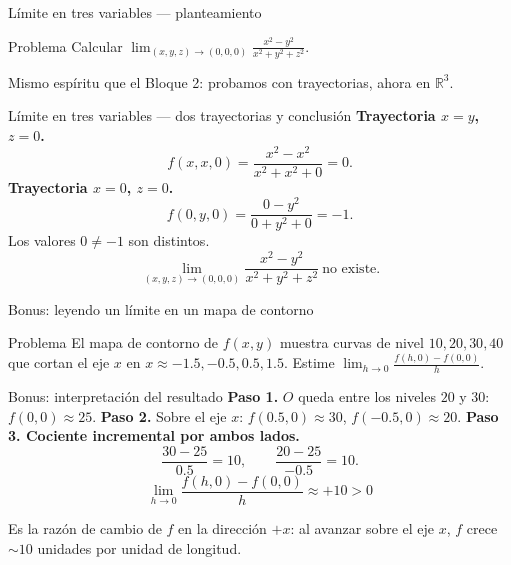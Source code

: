\documentclass[11pt,aspectratio=169]{beamer}
\begin{document}
\begin{frame}{Límite en tres variables --- planteamiento}
  \begin{block}{Problema}
    Calcular $\displaystyle\lim_{(x,y,z)\to(0,0,0)}\frac{x^2-y^2}{x^2+y^2+z^2}$.
  \end{block}
  \pause
  \vspace{4pt}
  \begin{center}\small\color{gray60} Mismo espíritu que el Bloque 2: probamos con trayectorias, ahora en $\mathbb R^3$.\end{center}
\end{frame}

\begin{frame}{Límite en tres variables --- dos trayectorias y conclusión}
  \textbf{Trayectoria $x=y$, $z=0$.}
  \[
    f(x,x,0)=\frac{x^2-x^2}{x^2+x^2+0}=0.
  \]
  \pause
  \textbf{Trayectoria $x=0$, $z=0$.}
  \[
    f(0,y,0)=\frac{0-y^2}{0+y^2+0}=-1.
  \]
  \pause
  Los valores $0\neq -1$ son distintos.
  \pause
  \[
    \boxed{\lim_{(x,y,z)\to(0,0,0)}\frac{x^2-y^2}{x^2+y^2+z^2}\ \text{no existe.}}
  \]
\end{frame}

\begin{frame}{Bonus: leyendo un límite en un mapa de contorno}
  \begin{block}{Problema}
    El mapa de contorno de $f(x,y)$ muestra curvas de nivel $10,20,30,40$ que cortan el eje $x$ en $x\approx-1.5,-0.5,0.5,1.5$. Estime
    $\displaystyle\lim_{h\to 0}\frac{f(h,0)-f(0,0)}{h}$.
  \end{block}
  \vspace{-2pt}
  \begin{center}
  \end{center}
\end{frame}

\begin{frame}{Bonus: interpretación del resultado}
  \textbf{Paso 1.} $O$ queda entre los niveles $20$ y $30$: $f(0,0)\approx 25$.
  \pause
  \textbf{Paso 2.} Sobre el eje $x$: $f(0.5,0)\approx 30$, $f(-0.5,0)\approx 20$.
  \pause
  \textbf{Paso 3. Cociente incremental por ambos lados.}
  \[
    \frac{30-25}{0.5}=10,
    \qquad
    \frac{20-25}{-0.5}=10.
  \]
  \pause
  \[
    \boxed{\lim_{h\to 0}\frac{f(h,0)-f(0,0)}{h}\approx +10>0}
  \]
  \pause
  \begin{center}\small\color{gray60} Es la razón de cambio de $f$ en la dirección $+x$: al avanzar sobre el eje $x$, $f$ crece $\sim 10$ unidades por unidad de longitud.\end{center}
\end{frame}
\end{document}

